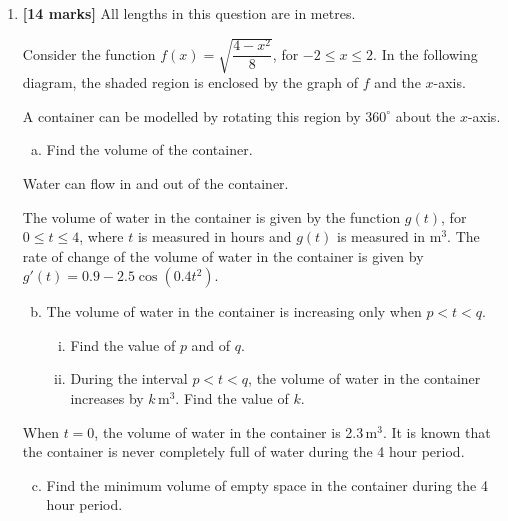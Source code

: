 \documentclass[12pt, twoside]{article}
\begin{document}
\begin{enumerate}
\vspace{1cm}

\item \textbf{[14 marks]} All lengths in this question are in metres.

Consider the function $f(x) = \sqrt{\dfrac{4-x^2}{8}}$, for $-2 \leq x \leq 2$. In the following diagram, the shaded region is enclosed by the graph of $f$ and the $x$-axis.

\begin{center}
\end{center}

A container can be modelled by rotating this region by $360^\circ$ about the $x$-axis.

\begin{enumerate}[(a)]
    \item Find the volume of the container.
\end{enumerate}

Water can flow in and out of the container.

The volume of water in the container is given by the function $g(t)$, for $0 \leq t \leq 4$, where $t$ is measured in hours and $g(t)$ is measured in m$^3$. The rate of change of the volume of water in the container is given by $g'(t) = 0.9 - 2.5\cos(0.4t^2)$.

\begin{enumerate}[(a)]
    \setcounter{enumii}{1}
    \item The volume of water in the container is increasing only when $p < t < q$.
    \begin{enumerate}[(i)]
        \item Find the value of $p$ and of $q$.
        \item During the interval $p < t < q$, the volume of water in the container increases by $k$\,m$^3$. Find the value of $k$.
    \end{enumerate}
\end{enumerate}

When $t = 0$, the volume of water in the container is 2.3\,m$^3$. It is known that the container is never completely full of water during the 4 hour period.

\begin{enumerate}[(a)]
    \setcounter{enumii}{2}
    \item Find the minimum volume of empty space in the container during the 4 hour period.
\end{enumerate}

\end{enumerate}
\end{document}
